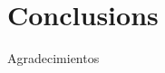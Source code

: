 \documentclass[Afour,sageh,times]{sagej}
\begin{document}
\section{Conclusions}


%




\begin{acks}
Agradecimientos
\end{acks}






\end{document}
